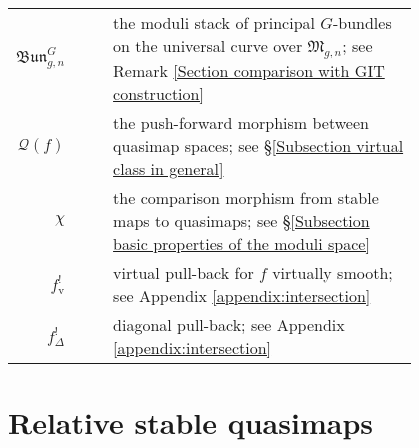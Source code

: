 \documentclass[11pt]{amsart}
\newcommand{\MM}{\mathfrak M}
\newcommand{\om}[1]{\mathcal{#1}}
\theoremstyle{definition}
\theoremstyle{definition}
\begin{document}
\begin{longtabu}{r c c p{0.8\linewidth}}
$\mathfrak{Bun}^{G}_{g,n}$ & & & the moduli stack of principal $G$-bundles on the universal curve over $\MM_{g,n}$; see Remark \ref{Section comparison with GIT construction} \\
$\om{Q}(f)$ & & & the push-forward morphism between quasimap spaces; see \S \ref{Subsection virtual class in general} \\
$\chi$ & & & the comparison morphism from stable maps to quasimaps; see \S \ref{Subsection basic properties of the moduli space} \\
$f^!_{\text{v}}$ & & & virtual pull-back for $f$ virtually smooth; see Appendix \ref{appendix:intersection} \\
$f^!_{\Delta}$ & & & diagonal pull-back; see Appendix \ref{appendix:intersection}
\end{longtabu}
 
\section{Relative stable quasimaps} \label{Section relative stable quasimaps}
\end{document}
